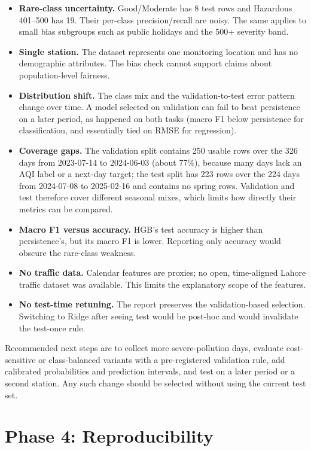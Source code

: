 \begin{itemize}[leftmargin=1.4em]
  \item \textbf{Rare-class uncertainty.} Good/Moderate has 8 test rows and Hazardous 401--500 has 19. Their per-class precision/recall are noisy. The same applies to small bias subgroups such as public holidays and the 500+ severity band.
  \item \textbf{Single station.} The dataset represents one monitoring location and has no demographic attributes. The bias check cannot support claims about population-level fairness.
  \item \textbf{Distribution shift.} The class mix and the validation-to-test error pattern change over time. A model selected on validation can fail to beat persistence on a later period, as happened on both tasks (macro F1 below persistence for classification, and essentially tied on RMSE for regression).
  \item \textbf{Coverage gaps.} The validation split contains 250 usable rows over the 326 days from 2023-07-14 to 2024-06-03 (about 77\%), because many days lack an AQI label or a next-day target; the test split has 223 rows over the 224 days from 2024-07-08 to 2025-02-16 and contains no spring rows. Validation and test therefore cover different seasonal mixes, which limits how directly their metrics can be compared.
  \item \textbf{Macro F1 versus accuracy.} HGB's test accuracy is higher than persistence's, but its macro F1 is lower. Reporting only accuracy would obscure the rare-class weakness.
  \item \textbf{No traffic data.} Calendar features are proxies; no open, time-aligned Lahore traffic dataset was available. This limits the explanatory scope of the features.
  \item \textbf{No test-time retuning.} The report preserves the validation-based selection. Switching to Ridge after seeing test would be post-hoc and would invalidate the test-once rule.
\end{itemize}

Recommended next steps are to collect more severe-pollution days, evaluate cost-sensitive or class-balanced variants with a pre-registered validation rule, add calibrated probabilities and prediction intervals, and test on a later period or a second station. Any such change should be selected without using the current test set.

\section{Phase 4: Reproducibility}

